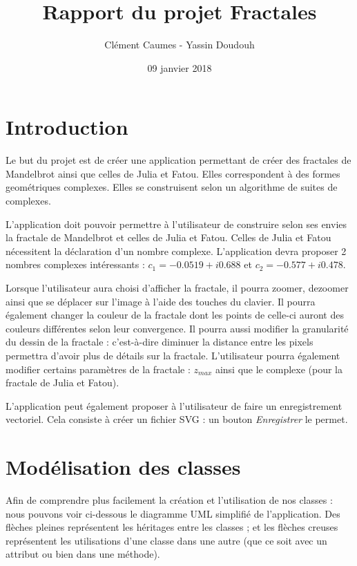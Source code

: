 \documentclass[a4]{article}
\author{Clément Caumes - Yassin Doudouh}
\title{Rapport du projet Fractales}
\date{09 janvier 2018}
\begin{document}
\maketitle

\section{Introduction}

Le but du projet est de créer une application permettant de créer des fractales de Mandelbrot ainsi que celles de Julia et Fatou. 
Elles correspondent à des formes geométriques complexes. Elles se construisent selon un algorithme de suites de complexes. 
\vspace{1\baselineskip}

L'application doit pouvoir permettre à l'utilisateur de construire selon ses envies la fractale de Mandelbrot et celles de Julia et Fatou. 
Celles de Julia et Fatou nécessitent la déclaration d'un nombre complexe. L'application devra proposer 2 nombres complexes intéressants : 
$ c_1 = -0.0519 + i0.688 $ et $c_2 = -0.577 + i0.478$.
\vspace{1\baselineskip}

Lorsque l'utilisateur aura choisi d'afficher la fractale, il pourra zoomer, dezoomer ainsi que se déplacer sur l'image à l'aide des touches du clavier. 
Il pourra également changer la couleur de la fractale dont les points de celle-ci auront des couleurs différentes selon leur convergence. 
Il pourra aussi modifier la granularité du dessin de la fractale : c'est-à-dire diminuer la distance entre les pixels permettra d'avoir plus de détails sur la fractale. 
L'utilisateur pourra également modifier certains paramètres de la fractale : $z_{max}$ ainsi que le complexe (pour la fractale de Julia et Fatou). 

L'application peut également proposer à l'utilisateur de faire un enregistrement vectoriel. Cela consiste à créer un fichier SVG : un bouton \emph{Enregistrer} le permet. 
\vspace{1\baselineskip} 

\section{Modélisation des classes}

Afin de comprendre plus facilement la création et l'utilisation de nos classes : nous pouvons voir ci-dessous le diagramme UML simplifié de l'application. 
Des flèches pleines représentent les héritages entre les classes ; et les flèches creuses représentent les utilisations d'une classe dans une autre (que ce soit avec un attribut ou bien dans une méthode). 
\end{document}
